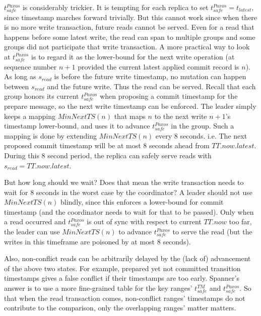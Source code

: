 $t_{safe}^{Paxos}$ is considerably trickier. It is tempting for each replica to
set $t_{safe}^{Paxos} = t_{latest}$, since timestamp marches forward trivially.
But this cannot work since when there is no more write transaction, future
reads cannot be served. Even for a read that happens before some latest write,
the read can span to multiple groups and some groups did not participate that
write transaction. A more practical way to look at $t_{safe}^{Paxos}$ is to
regard it as the lower-bound for the next write operation (at sequence number
$n+1$ provided the current latest applied commit record is $n$). As long as
$s_{read}$ is before the future write timestamp, no mutation can happen
between $s_{read}$ and the future write. Thus the read can be served. Recall
that each group honors its current $t_{safe}^{Paxos}$ when proposing a commit
timestamp for the prepare message, so the next write timestamp can be
enforced. The leader simply keeps a mapping $MinNextTS(n)$ that maps $n$ to
the next write $n+1$'s timestamp lower-bound, and uses it to advance
$t_{safe}^{Paxos}$ in the group. Such a mapping is done by extending
$MinNextTS(n)$ every 8 seconds. i.e. The next proposed commit timestamp will
be at most 8 seconds ahead from $TT.now.latest$. During this 8 second period,
the replica can safely serve reads with $s_{read} = TT.now.latest$.

But how long should we wait? Does that mean the write transaction needs to
wait for 8 seconds in the worst case by the coordinator? A leader should not
use $MinNextTS(n)$ blindly, since this enforces a lower-bound for commit
timestamp (and the coordinator needs to wait for that to be passed). Only
when a read occurred and $t_{safe}^{Paxos}$ is out of sync with respect to
current $TT.now$ too far, the leader can use $MinNextTS(n)$ to advance
$t_{safe}^{Paxos}$ to serve the read (but the writes in this
timeframe are poisoned by at most 8 seconds).

Also, non-conflict reads can be arbitrarily delayed by the (lack of)
advancement of the above two states. For example, prepared yet not committed
transition timestamps gives a false conflict if their timestamps are too
early. Spanner's answer is to use a more fine-grained table for the key
ranges' $t_{safe}^{TM}$ and $t_{safe}^{Paxos}$. So that when the read
transaction comes, non-conflict ranges' timestamps do not contribute to the
comparison, only the overlapping ranges' matter matters.

{}


